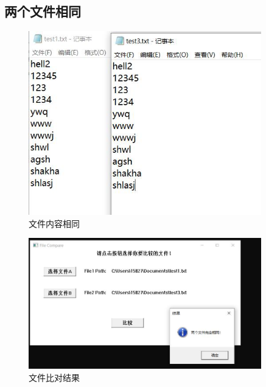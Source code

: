\subsection{两个文件相同}
\begin{figure}[H]
    \centering
    \includegraphics[width= 0.9\textwidth]{assets/文件比对3}
    \caption{文件内容相同}
    \label{文件内容3}
\end{figure}
\begin{figure}[H]
    \centering
    \includegraphics[width= 0.9\textwidth]{assets/文件比对4}
    \caption{文件比对结果}
    \label{文件比对结果1}
\end{figure}
